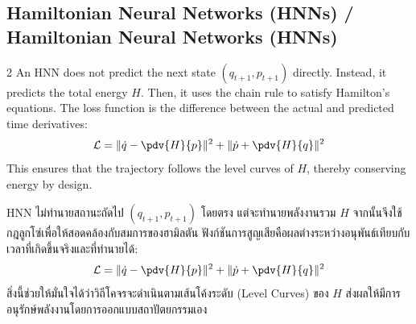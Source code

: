 \subsection{Hamiltonian Neural Networks (HNNs) \quad / \quad \textthai{Hamiltonian Neural Networks (HNNs)}}
\begin{paracol}{2}
An HNN does not predict the next state $(q_{t+1}, p_{t+1})$ directly. Instead, it predicts the total energy $H$. Then, it uses the chain rule to satisfy Hamilton's equations. The loss function is the difference between the actual and predicted time derivatives:
\begin{equation}
    \mathcal{L} = \| \dot{q} - \pdv{H}{p} \|^2 + \| \dot{p} + \pdv{H}{q} \|^2
\end{equation}
This ensures that the trajectory follows the level curves of $H$, thereby conserving energy by design.

\switchcolumn

HNN ไม่ทำนายสถานะถัดไป $(q_{t+1}, p_{t+1})$ โดยตรง แต่จะทำนายพลังงานรวม $H$ จากนั้นจึงใช้กฎลูกโซ่เพื่อให้สอดคล้องกับสมการของฮามิลตัน ฟังก์ชันการสูญเสียคือผลต่างระหว่างอนุพันธ์เทียบกับเวลาที่เกิดขึ้นจริงและที่ทำนายได้:
\begin{equation}
    \mathcal{L} = \| \dot{q} - \pdv{H}{p} \|^2 + \| \dot{p} + \pdv{H}{q} \|^2
\end{equation}
สิ่งนี้ช่วยให้มั่นใจได้ว่าวิถีโคจรจะดำเนินตามเส้นโค้งระดับ (Level Curves) ของ $H$ ส่งผลให้มีการอนุรักษ์พลังงานโดยการออกแบบสถาปัตยกรรมเอง
\end{paracol}

